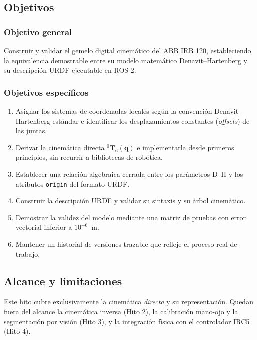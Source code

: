 \documentclass[11pt,a4paper]{article}
\newcommand{\T}[2]{{}^{#1}\mathbf{T}_{#2}}
\newcommand{\mat}[1]{\mathbf{#1}}
\begin{document}
\subsection{Objetivos}

\subsubsection*{Objetivo general}

Construir y validar el gemelo digital cinemático del ABB IRB 120,
estableciendo la equivalencia demostrable entre su modelo matemático
Denavit--Hartenberg y su descripción URDF ejecutable en ROS 2.

\subsubsection*{Objetivos específicos}

\begin{enumerate}[label=\textbf{O\arabic*.},leftmargin=*]
\item Asignar los sistemas de coordenadas locales según la convención
      Denavit--Hartenberg estándar e identificar los desplazamientos
      constantes (\emph{offsets}) de las juntas.
\item Derivar la cinemática directa $\T{0}{6}(\mat{q})$ e implementarla
      desde primeros principios, sin recurrir a bibliotecas de robótica.
\item Establecer una relación algebraica cerrada entre los parámetros
      D--H y los atributos \texttt{origin} del formato URDF.
\item Construir la descripción URDF y validar su sintaxis y su árbol
      cinemático.
\item Demostrar la validez del modelo mediante una matriz de pruebas con
      error vectorial inferior a $10^{-6}$~m.
\item Mantener un historial de versiones trazable que refleje el proceso
      real de trabajo.
\end{enumerate}

\subsection{Alcance y limitaciones}

Este hito cubre exclusivamente la cinemática \emph{directa} y su
representación. Quedan fuera del alcance la cinemática inversa (Hito 2),
la calibración mano-ojo y la segmentación por visión (Hito 3), y la
integración física con el controlador IRC5 (Hito 4).
\end{document}
